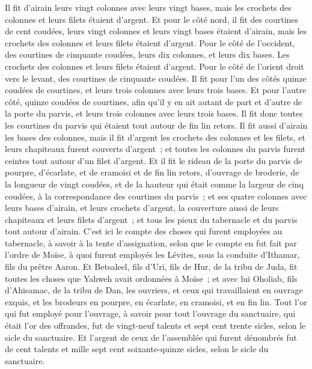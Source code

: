 \begin{multicols}{2}
Il fit d'airain leurs vingt colonnes avec leurs vingt bases, mais les crochets des colonnes et leurs filets étaient d'argent.
Et pour le côté nord, il fit des courtines de cent coudées, leurs vingt colonnes et leurs vingt bases étaient d'airain, mais les crochets des colonnes et leurs filets étaient d'argent.
Pour le côté de l'occident, des courtines de cinquante coudées, leurs dix colonnes, et leurs dix bases. Les crochets des colonnes et leurs filets étaient d'argent.
Pour le côté de l'orient droit vers le levant, des courtines de cinquante coudées.
Il fit pour l'un des côtés quinze coudées de courtines, et leurs trois colonnes avec leurs trois bases.
Et pour l'autre côté, quinze coudées de courtines, afin qu'il y en ait autant de part et d'autre de la porte du parvis, et leurs trois colonnes avec leurs trois bases.
Il fit donc toutes les courtines du parvis qui étaient tout autour de fin lin retors.
Il fit aussi d'airain les bases des colonnes, mais il fit d'argent les crochets des colonnes et les filets, et leurs chapiteaux furent couverts d'argent~; et toutes les colonnes du parvis furent ceintes tout autour d'un filet d'argent.
 Et il fit le rideau de la porte du parvis de pourpre, d'écarlate, et de cramoisi et de fin lin retors, d'ouvrage de broderie, de la longueur de vingt coudées, et de la hauteur qui était comme la largeur de cinq coudées, à la correspondance des courtines du parvis~;
et ses quatre colonnes avec leurs bases d'airain, et leurs crochets d'argent, la couverture aussi de leurs chapiteaux et leurs filets d'argent~;
 et tous les pieux du tabernacle et du parvis tout autour d'airain.
C'est ici le compte des choses qui furent employées au tabernacle, à savoir à la tente d'assignation, selon que le compte en fut fait par l'ordre de Moïse, à quoi furent employés les Lévites, sous la conduite d'Ithamar, fils du prêtre Aaron.
Et Betsaleel, fils d'Uri, fils de Hur, de la tribu de Juda, fit toutes les choses que Yahweh avait ordonnées à Moïse~;
et avec lui Oholiab, fils d'Ahisamac, de la tribu de Dan, les ouvriers, et ceux qui travaillaient en ouvrage exquis, et les brodeurs en pourpre, en écarlate, en cramoisi, et en fin lin.
Tout l'or qui fut employé pour l'ouvrage, à savoir pour tout l'ouvrage du sanctuaire, qui était l'or des offrandes, fut de vingt-neuf talents et sept cent trente sicles, selon le sicle du sanctuaire.
 Et l'argent de ceux de l'assemblée qui furent dénombrés fut de cent talents et mille sept cent soixante-quinze sicles, selon le sicle du sanctuaire.

\end{multicols}
